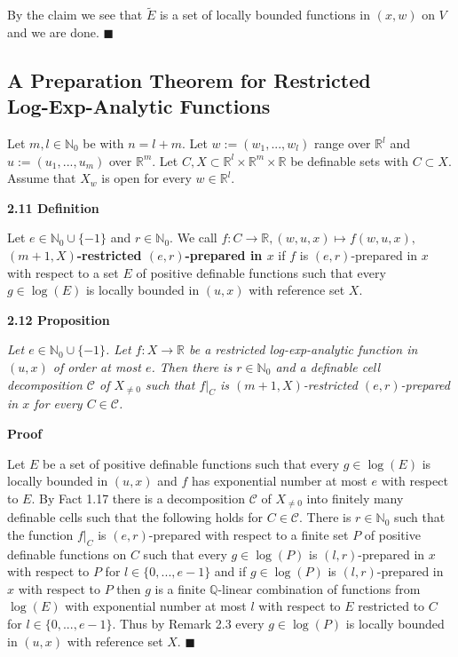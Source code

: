 \documentclass[12pt]{article}
\def\vs{\vspace}
\begin{document}
\vs{0.3cm}
By the claim we see that $\tilde{E}$ is a set of locally bounded functions in $(x,w)$ on $V$ and we are done. \hfill$\blacksquare$

\subsection{A Preparation Theorem for Restricted \\
	Log-Exp-Analytic Functions}

\vs{0.3cm}
Let $m,l \in \mathbb{N}_0$ be with $n=l+m$. Let $w:=(w_1,...,w_l)$ range over $\mathbb{R}^l$ and $u:=(u_1,...,u_m)$ over $\mathbb{R}^m$. Let $C,X \subset \mathbb{R}^l \times \mathbb{R}^m \times \mathbb{R}$ be definable sets with $C \subset X$. Assume that $X_w$ is open for every $w \in \mathbb{R}^l$. 

\vs{0.5cm}
{\bf2.11 Definition}

\vs{0.1cm}
Let $e \in \mathbb{N}_0 \cup \{-1\}$ and $r \in \mathbb{N}_0$. We call $f:C \to \mathbb{R}, (w,u,x) \mapsto f(w,u,x),$ \textbf{$(m+1,X)$-restricted $(e,r)$-prepared in $x$} if $f$ is $(e,r)$-prepared in $x$ with respect to a set $E$ of positive definable functions such that every $g \in \log(E)$ is locally bounded in $(u,x)$ with reference set $X$.

\vs{0.5cm}
{\bf2.12 Proposition}

\vs{0.1cm}
{\it
Let $e \in \mathbb{N}_0 \cup \{-1\}$. Let $f:X \to \mathbb{R}$ be a restricted log-exp-analytic function in $(u,x)$ of order at most $e$. Then there is $r \in \mathbb{N}_0$ and a definable cell decomposition $\mathcal{C}$ of $X_{\neq 0}$ such that $f|_C$ is $(m+1,X)$-restricted $(e,r)$-prepared in $x$ for every $C \in \mathcal{C}$.
}

\vs{0.3cm}
{\bf Proof}

\vs{0.1cm}
Let $E$ be a set of positive definable functions such that every $g \in \log(E)$ is locally bounded in $(u,x)$ and $f$ has exponential number at most $e$ with respect to $E$. By Fact 1.17 there is a decomposition $\mathcal{C}$ of $X_{\neq 0}$ into finitely many definable cells such that the following holds for $C \in \mathcal{C}$. There is $r \in \mathbb{N}_0$ such that the function $f|_C$ is $(e,r)$-prepared with respect to a finite set $P$ of positive definable functions on $C$ such that every $g \in \log(P)$ is $(l,r)$-prepared in $x$ with respect to $P$ for $l \in \{0,...,e-1\}$ and if $g \in \log(P)$ is $(l,r)$-prepared in $x$ with respect to $P$ then $g$ is a finite $\mathbb{Q}$-linear combination of functions from $\log(E)$ with exponential number at most $l$ with respect to $E$ restricted to $C$ for $l \in \{0,...,e-1\}$. Thus by Remark 2.3 every $g \in \log(P)$ is locally bounded in $(u,x)$ with reference set $X$. \hfill$\blacksquare$
\end{document}
